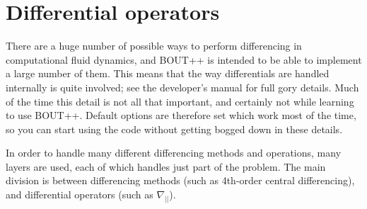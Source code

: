 \documentclass[12pt]{article}
\begin{document}
\section{Differential operators}
%
\label{sec:diffops}
%
There are a huge number of possible ways to perform differencing in
computational fluid dynamics, and BOUT++ is intended to be able to implement a
large number of them. This means that the way differentials are handled
internally is quite involved; see the developer's manual for full gory details.
Much of the time this detail is not all that important, and certainly not while
learning to use BOUT++. Default options are therefore set which work most of
the time, so you can start using the code without getting bogged down in these
details.

In order to handle many different differencing methods and operations, many
layers are used, each of which handles just part of the problem. The main
division is between differencing methods (such as 4th-order central
differencing), and differential operators (such as $\nabla_{||}$).
\end{document}
